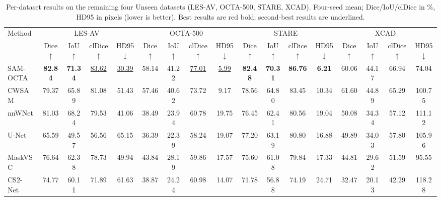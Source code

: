 \begin{table}[t]
\centering
\caption{Per-dataset results on the remaining four Unseen datasets (LES-AV, OCTA-500, STARE, XCAD). Four-seed mean; Dice/IoU/clDice in \%, HD95 in pixels (lower is better). Best results are red bold; second-best results are underlined.}
\label{tab:per_dataset_unseen_ii}
\tiny
\setlength{\tabcolsep}{1.5pt}
\begin{tabular*}{\textwidth}{@{\extracolsep{\fill}}lcccccccccccccccc@{}}
\toprule
Method & \multicolumn{4}{c}{LES-AV~\cite{orlando2018glaucoma}} & \multicolumn{4}{c}{OCTA-500~\cite{li2024octa500}} & \multicolumn{4}{c}{STARE~\cite{hoover2000stare}} & \multicolumn{4}{c}{XCAD~\cite{ma2021ssvs}} \\
\cmidrule(lr){2-5}
\cmidrule(lr){6-9}
\cmidrule(lr){10-13}
\cmidrule(lr){14-17}
 & Dice $\uparrow$ & IoU $\uparrow$ & clDice $\uparrow$ & HD95 $\downarrow$ & Dice $\uparrow$ & IoU $\uparrow$ & clDice $\uparrow$ & HD95 $\downarrow$ & Dice $\uparrow$ & IoU $\uparrow$ & clDice $\uparrow$ & HD95 $\downarrow$ & Dice $\uparrow$ & IoU $\uparrow$ & clDice $\uparrow$ & HD95 $\downarrow$ \\
\midrule
SAM-OCTA~\cite{wang2024sam_octa} & \textcolor{red!80!black}{\textbf{82.84}} & \textcolor{red!80!black}{\textbf{71.34}} & \underline{83.62} & \underline{30.39} & 58.14 & 41.22 & \underline{77.01} & \underline{5.99} & \textcolor{red!80!black}{\textbf{82.48}} & \textcolor{red!80!black}{\textbf{70.31}} & \textcolor{red!80!black}{\textbf{86.76}} & \textcolor{red!80!black}{\textbf{6.21}} & 60.06 & 44.17 & 66.94 & 74.04 \\
CWSAM~\cite{pu2025cwsam} & 79.37 & 65.89 & 81.08 & 51.43 & 57.46 & 40.62 & 73.72 & 9.17 & 78.56 & 64.80 & 83.45 & 10.34 & 61.60 & 44.89 & 65.29 & 100.75 \\
nnWNet~\cite{zhou2025nnwnet} & 81.03 & 68.24 & 79.53 & 41.06 & 38.49 & 23.94 & 60.78 & 19.75 & 76.45 & 62.41 & 80.56 & 19.04 & 50.08 & 34.34 & 57.12 & 111.12 \\
U-Net~\cite{ronneberger2015unet} & 65.59 & 49.57 & 56.56 & 65.15 & 36.39 & 22.39 & 58.24 & 19.07 & 77.20 & 63.19 & 80.80 & 16.88 & 49.89 & 34.03 & 57.80 & 105.96 \\
MaskVSC~\cite{zhou2025maskvsc} & 76.64 & 62.38 & 78.73 & 49.94 & 43.84 & 28.19 & 59.86 & 17.57 & 75.60 & 61.08 & 79.84 & 17.33 & 44.81 & 29.62 & 51.59 & 95.55 \\
CS2-Net~\cite{mou2021cs2net} & 74.77 & 60.11 & 71.89 & 61.63 & 38.87 & 24.24 & 60.98 & 14.07 & 71.78 & 56.88 & 74.19 & 24.71 & 32.47 & 20.13 & 42.29 & 118.28 \\

\end{tabular*}
\end{table}
